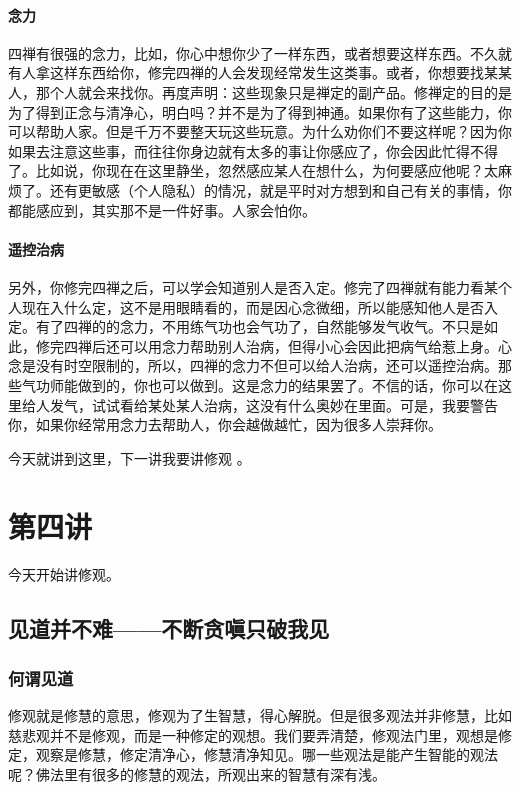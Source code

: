 \documentclass{book}
\begin{document}
\subsubsection{念力}

四禅有很强的念力，比如，你心中想你少了一样东西，或者想要这样东西。不久就有人拿这样东西给你，修完四禅的人会发现经常发生这类事。或者，你想要找某某人，那个人就会来找你。再度声明：这些现象只是禅定的副产品。修禅定的目的是为了得到正念与清净心，明白吗？并不是为了得到神通。如果你有了这些能力，你可以帮助人家。但是千万不要整天玩这些玩意。为什么劝你们不要这样呢？因为你如果去注意这些事，而往往你身边就有太多的事让你感应了，你会因此忙得不得了。比如说，你现在在这里静坐，忽然感应某人在想什么，为何要感应他呢？太麻烦了。还有更敏感（个人隐私）的情况，就是平时对方想到和自己有关的事情，你都能感应到，其实那不是一件好事。人家会怕你。

\subsubsection{遥控治病}

另外，你修完四禅之后，可以学会知道别人是否入定。修完了四禅就有能力看某个人现在入什么定，这不是用眼睛看的，而是因心念微细，所以能感知他人是否入定。有了四禅的的念力，不用练气功也会气功了，自然能够发气收气。不只是如此，修完四禅后还可以用念力帮助别人治病，但得小心会因此把病气给惹上身。心念是没有时空限制的，所以，四禅的念力不但可以给人治病，还可以遥控治病。那些气功师能做到的，你也可以做到。这是念力的结果罢了。不信的话，你可以在这里给人发气，试试看给某处某人治病，这没有什么奥妙在里面。可是，我要警告你，如果你经常用念力去帮助人，你会越做越忙，因为很多人崇拜你。

今天就讲到这里，下一讲我要讲修观 。

\chapter{第四讲}

今天开始讲修观。

\section{见道并不难——不断贪嗔只破我见}

\subsection{何谓见道}

修观就是修慧的意思，修观为了生智慧，得心解脱。但是很多观法并非修慧，比如慈悲观并不是修观，而是一种修定的观想。我们要弄清楚，修观法门里，观想是修定，观察是修慧，修定清净心，修慧清净知见。哪一些观法是能产生智能的观法呢？佛法里有很多的修慧的观法，所观出来的智慧有深有浅。
\end{document}
